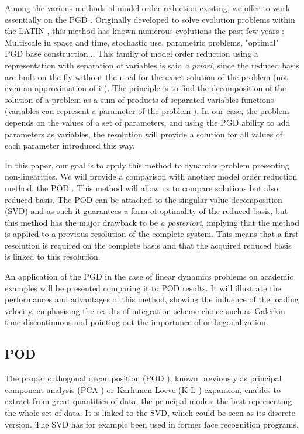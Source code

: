 \documentclass[12pt,a4paper]{article}
\begin{document}
Among the various methods of model order reduction existing, we offer to work essentially on the PGD \cite{ladeveze1999nonlinear,Multidimensional,ShortReview}. Originally developed to solve evolution problems within the LATIN \cite{ladeveze1989latin}, this method has known numerous evolutions the past few years \cite{ElasticVisco,Parametrized}: Multiscale in space and time, stochastic use, parametric problems, "optimal" PGD base construction... This family of model order reduction using a representation with separation of variables is said \textit{a priori}, since the reduced basis are built on the fly without the need for the exact solution of the problem (not even an approximation of it). The principle is to find the decomposition of the solution of a problem as a sum of products of separated variables functions (variables can represent a parameter of the problem \cite{Multidimensional}). In our case, the problem depends on the values of a set of parameters, and using the PGD ability to add parameters as variables, the resolution will provide a solution for all values of each parameter introduced this way.

In this paper, our goal is to apply this method to dynamics problem presenting non-linearities. We will provide a comparison with another model order reduction method, the POD \cite{Chatterjee}. This method will allow us to compare solutions but also reduced basis. The POD can be attached to the singular value decomposition (SVD) and as such it guarantees a form of optimality of the reduced basis, but this method has the major drawback to be \textit{a posteriori}, implying that the method is applied to a previous resolution of the complete system. This means that a first resolution is required on the complete basis and that the acquired reduced basis is linked to this resolution.

An application of the PGD in the case of linear dynamics problems on academic examples will be presented comparing it to POD results. It will illustrate the performances and advantages of this method, showing the influence of the loading velocity, emphasising the results of integration scheme choice such as Galerkin time discontinuous \cite{GDDisc} and pointing out the importance of orthogonalization.



\subsection{POD}
\label{IntroPOD}
The proper orthogonal decomposition (POD \cite{Chatterjee}), known previously as principal component analysis (PCA \cite{PCA}) or Karhunen-Loeve (K-L \cite{kittler1973new}) expansion, enables to extract from great quantities of data, the principal modes: the best representing the whole set of data. It is linked to the SVD, which could be seen as its discrete version. The SVD has for example been used in former face recognition programs.
\end{document}
